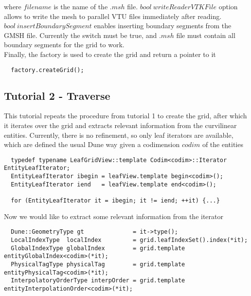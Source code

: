 \noindent
where $filename$ is the name of the $.msh$ file. $bool\ writeReaderVTKFile$ option allows to write the mesh to parallel VTU files immediately after reading. $bool\ insertBoundarySegment$ enables inserting boundary segments from the GMSH file. Currently the switch must be true, and $.msh$ file must contain all boundary segments for the grid to work. \\

\noindent
Finally, the factory is used to create the grid and return a pointer to it \\
\begin{mybox}
\begin{lstlisting}
  factory.createGrid();
\end{lstlisting}
\end{mybox}


\subsection{Tutorial 2 - Traverse}
\label{usage-howto-tutorial-traverse}

This tutorial repeats the procedure from tutorial 1 to create the grid, after which it iterates over the grid and extracts relevant information from the curvilinear entities. Currently, there is no refinement, so only leaf iterators are available, which are defined the usual Dune way given a codimension $codim$ of the entities\\

\begin{mybox}
\begin{lstlisting}
  typedef typename LeafGridView::template Codim<codim>::Iterator EntityLeafIterator;
  EntityLeafIterator ibegin = leafView.template begin<codim>();
  EntityLeafIterator iend   = leafView.template end<codim>();
  
  for (EntityLeafIterator it = ibegin; it != iend; ++it) {...}
\end{lstlisting}
\end{mybox}


Now we would like to extract some relevant information from the iterator \\
\begin{mybox}
\begin{lstlisting}
  Dune::GeometryType gt              = it->type();
  LocalIndexType  localIndex         = grid.leafIndexSet().index(*it);
  GlobalIndexType globalIndex        = grid.template entityGlobalIndex<codim>(*it);
  PhysicalTagType physicalTag        = grid.template entityPhysicalTag<codim>(*it);
  InterpolatoryOrderType interpOrder = grid.template entityInterpolationOrder<codim>(*it);
\end{lstlisting}
\end{mybox}

